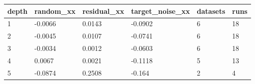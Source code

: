 \begin{tabular}{llllll}
\toprule
depth & random\_xx & residual\_xx & target\_noise\_xx & datasets & runs \\
\midrule
1 & -0.0066 & 0.0143 & -0.0902 & 6 & 18 \\
2 & -0.0045 & 0.0107 & -0.0741 & 6 & 18 \\
3 & -0.0034 & 0.0012 & -0.0603 & 6 & 18 \\
4 & 0.0067 & 0.0021 & -0.1118 & 5 & 13 \\
5 & -0.0874 & 0.2508 & -0.164 & 2 & 4 \\
\bottomrule
\end{tabular}
